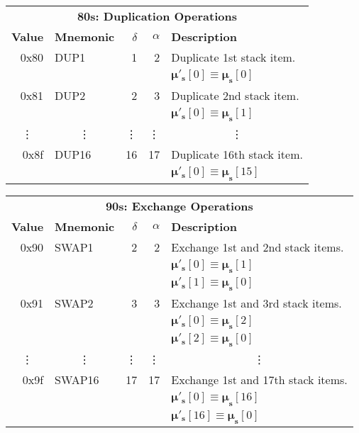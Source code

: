 \documentclass[9pt,oneside]{amsart}
\begin{document}
\begin{tabular*}{\columnwidth}[h]{rlrrl}
\toprule
\multicolumn{5}{c}{\textbf{80s: Duplication Operations}} \vspace{5pt} \\
\textbf{Value} & \textbf{Mnemonic} & $\delta$ & $\alpha$ & \textbf{Description} \vspace{5pt} \\
0x80 & {\small DUP1} & 1 & 2 & Duplicate 1st stack item. \\
&&&& $\boldsymbol{\mu}'_{\mathbf{s}}[0] \equiv \boldsymbol{\mu}_{\mathbf{s}}[0]$ \\
\midrule
0x81 & {\small DUP2} & 2 & 3 & Duplicate 2nd stack item. \\
&&&& $\boldsymbol{\mu}'_{\mathbf{s}}[0] \equiv \boldsymbol{\mu}_{\mathbf{s}}[1]$ \\
\midrule
\multicolumn{1}{c}{\vdots} & \multicolumn{1}{c}{\vdots} & \vdots & \vdots & \multicolumn{1}{c}{\vdots} \\
\midrule
0x8f & {\small DUP16} & 16 & 17 & Duplicate 16th stack item. \\
&&&& $\boldsymbol{\mu}'_{\mathbf{s}}[0] \equiv \boldsymbol{\mu}_{\mathbf{s}}[15]$ \\
\bottomrule
\end{tabular*}

\begin{tabular*}{\columnwidth}[h]{rlrrl}
\toprule
\multicolumn{5}{c}{\textbf{90s: Exchange Operations}} \vspace{5pt} \\
\textbf{Value} & \textbf{Mnemonic} & $\delta$ & $\alpha$ & \textbf{Description} \vspace{5pt} \\
0x90 & {\small SWAP1} & 2 & 2 & Exchange 1st and 2nd stack items. \\
&&&& $\boldsymbol{\mu}'_{\mathbf{s}}[0] \equiv \boldsymbol{\mu}_{\mathbf{s}}[1]$ \\
&&&& $\boldsymbol{\mu}'_{\mathbf{s}}[1] \equiv \boldsymbol{\mu}_{\mathbf{s}}[0]$ \\
\midrule
0x91 & {\small SWAP2} & 3 & 3 & Exchange 1st and 3rd stack items. \\
&&&& $\boldsymbol{\mu}'_{\mathbf{s}}[0] \equiv \boldsymbol{\mu}_{\mathbf{s}}[2]$ \\
&&&& $\boldsymbol{\mu}'_{\mathbf{s}}[2] \equiv \boldsymbol{\mu}_{\mathbf{s}}[0]$ \\
\midrule
\multicolumn{1}{c}{\vdots} & \multicolumn{1}{c}{\vdots} & \vdots & \vdots & \multicolumn{1}{c}{\vdots} \\
\midrule
0x9f & {\small SWAP16} & 17 & 17 & Exchange 1st and 17th stack items. \\
&&&& $\boldsymbol{\mu}'_{\mathbf{s}}[0] \equiv \boldsymbol{\mu}_{\mathbf{s}}[16]$ \\
&&&& $\boldsymbol{\mu}'_{\mathbf{s}}[16] \equiv \boldsymbol{\mu}_{\mathbf{s}}[0]$ \\
\bottomrule
\end{tabular*}
\end{document}
